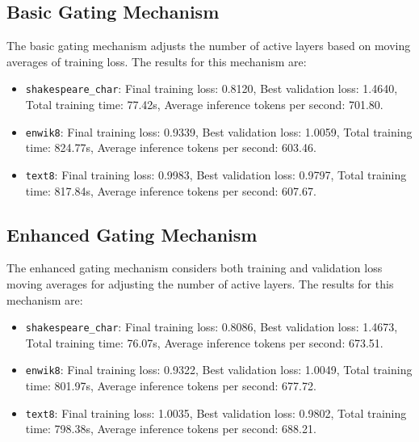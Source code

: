 \documentclass{article} %
\begin{document}
\subsection{Basic Gating Mechanism}
The basic gating mechanism adjusts the number of active layers based on moving averages of training loss. The results for this mechanism are:
\begin{itemize}
    \item \texttt{shakespeare\_char}: Final training loss: 0.8120, Best validation loss: 1.4640, Total training time: 77.42s, Average inference tokens per second: 701.80.
    \item \texttt{enwik8}: Final training loss: 0.9339, Best validation loss: 1.0059, Total training time: 824.77s, Average inference tokens per second: 603.46.
    \item \texttt{text8}: Final training loss: 0.9983, Best validation loss: 0.9797, Total training time: 817.84s, Average inference tokens per second: 607.67.
\end{itemize}

\subsection{Enhanced Gating Mechanism}
The enhanced gating mechanism considers both training and validation loss moving averages for adjusting the number of active layers. The results for this mechanism are:
\begin{itemize}
    \item \texttt{shakespeare\_char}: Final training loss: 0.8086, Best validation loss: 1.4673, Total training time: 76.07s, Average inference tokens per second: 673.51.
    \item \texttt{enwik8}: Final training loss: 0.9322, Best validation loss: 1.0049, Total training time: 801.97s, Average inference tokens per second: 677.72.
    \item \texttt{text8}: Final training loss: 1.0035, Best validation loss: 0.9802, Total training time: 798.38s, Average inference tokens per second: 688.21.
\end{itemize}

\end{document}
